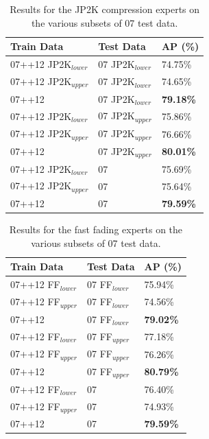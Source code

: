 \begin{table}[h]
\centering
\caption{Results for the JP2K compression experts on the various subsets of 07 test data.}
\label{tab:jp2k_experts}
\begin{tabular}{|l|l|l|}
\hline
\textbf{Train Data}           & \textbf{Test Data}        & \textbf{AP (\%)} \\ \hline
07++12 JP2K$_{lower}$ & 07 JP2K$_{lower}$ & 74.75\% \\ \hline
07++12 JP2K$_{upper}$ & 07 JP2K$_{lower}$ & 74.65\% \\ \hline
07++12               & 07 JP2K$_{lower}$ & \textbf{79.18\%} \\ \hline
07++12 JP2K$_{lower}$ & 07 JP2K$_{upper}$ & 75.86\% \\ \hline
07++12 JP2K$_{upper}$ & 07 JP2K$_{upper}$ & 76.66\% \\ \hline
07++12               & 07 JP2K$_{upper}$ & \textbf{80.01\%} \\ \hline
07++12 JP2K$_{lower}$ & 07               & 75.69\% \\ \hline
07++12 JP2K$_{upper}$ & 07               & 75.64\% \\ \hline
07++12               & 07               & \textbf{79.59\%} \\ \hline
\end{tabular}
\end{table}


\begin{table}[h]
\centering
\caption{Results for the fast fading experts on the various subsets of 07 test data.}
\label{tab:ff_experts}
\begin{tabular}{|l|l|l|}
\hline
\textbf{Train Data}           & \textbf{Test Data}        & \textbf{AP (\%)} \\ \hline
07++12 FF$_{lower}$ & 07 FF$_{lower}$ & 75.94\% \\ \hline
07++12 FF$_{upper}$ & 07 FF$_{lower}$ & 74.56\% \\ \hline
07++12               & 07 FF$_{lower}$ & \textbf{79.02\%} \\ \hline
07++12 FF$_{lower}$ & 07 FF$_{upper}$ & 77.18\% \\ \hline
07++12 FF$_{upper}$ & 07 FF$_{upper}$ & 76.26\% \\ \hline
07++12               & 07 FF$_{upper}$ & \textbf{80.79\%} \\ \hline
07++12 FF$_{lower}$ & 07               & 76.40\% \\ \hline
07++12 FF$_{upper}$ & 07               & 74.93\% \\ \hline
07++12               & 07               & \textbf{79.59\%} \\ \hline
\end{tabular}
\end{table}

